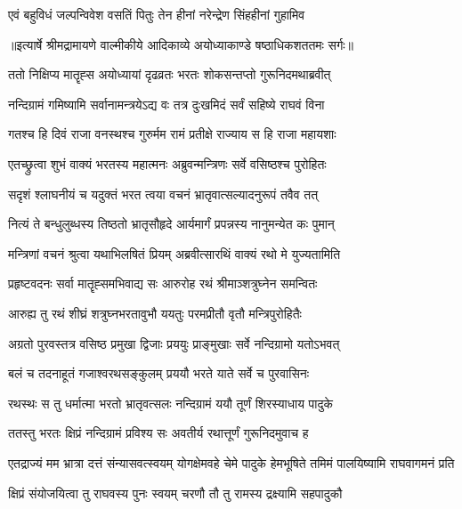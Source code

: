 \twolineshloka
{एवं बहुविधं जल्पन्विवेश वसतिं पितुः}
{तेन हीनां नरेन्द्रेण सिंहहीनां गुहामिव} %


{॥इत्यार्षे श्रीमद्रामायणे वाल्मीकीये आदिकाव्ये अयोध्याकाण्डे षष्ठाधिकशततमः सर्गः॥}


\twolineshloka
{ततो निक्षिप्य मातॄह्स अयोध्यायां दृढव्रतः}
{भरतः शोकसन्तप्तो गुरूनिदमथाब्रवीत्} %

\twolineshloka
{नन्दिग्रामं गमिष्यामि सर्वानामन्त्रयेऽद्य वः}
{तत्र दुःखमिदं सर्वं सहिष्ये राघवं विना} %

\twolineshloka
{गतश्च हि दिवं राजा वनस्थश्च गुरुर्मम}
{रामं प्रतीक्षे राज्याय स हि राजा महायशाः} %

\twolineshloka
{एतच्छ्रुत्वा शुभं वाक्यं भरतस्य महात्मनः}
{अब्रुवन्मन्त्रिणः सर्वे वसिष्ठश्च पुरोहितः} %

\twolineshloka
{सदृशं श्लाघनीयं च यदुक्तं भरत त्वया}
{वचनं भ्रातृवात्सल्यादनुरूपं तवैव तत्} %

\twolineshloka
{नित्यं ते बन्धुलुब्धस्य तिष्ठतो भ्रातृसौहृदे}
{आर्यमार्गं प्रपन्नस्य नानुमन्येत कः पुमान्} %

\twolineshloka
{मन्त्रिणां वचनं श्रुत्वा यथाभिलषितं प्रियम्}
{अब्रवीत्सारथिं वाक्यं रथो मे युज्यतामिति} %

\twolineshloka
{प्रहृष्टवदनः सर्वा मातॄह्समभिवाद्य सः}
{आरुरोह रथं श्रीमाञ्शत्रुघ्नेन समन्वितः} %

\twolineshloka
{आरुह्य तु रथं शीघ्रं शत्रुघ्नभरतावुभौ}
{ययतुः परमप्रीतौ वृतौ मन्त्रिपुरोहितैः} %

\twolineshloka
{अग्रतो पुरवस्तत्र वसिष्ठ प्रमुखा द्विजाः}
{प्रययुः प्राङ्मुखाः सर्वे नन्दिग्रामो यतोऽभवत्} %

\twolineshloka
{बलं च तदनाहूतं गजाश्वरथसङ्कुलम्}
{प्रययौ भरते याते सर्वे च पुरवासिनः} %

\twolineshloka
{रथस्थः स तु धर्मात्मा भरतो भ्रातृवत्सलः}
{नन्दिग्रामं ययौ तूर्णं शिरस्याधाय पादुके} %

\twolineshloka
{ततस्तु भरतः क्षिप्रं नन्दिग्रामं प्रविश्य सः}
{अवतीर्य रथात्तूर्णं गुरूनिदमुवाच ह} %

\threelineshloka
{एतद्राज्यं मम भ्रात्रा दत्तं संन्यासवत्स्वयम्}
{योगक्षेमवहे चेमे पादुके हेमभूषिते}
{तमिमं पालयिष्यामि राघवागमनं प्रति} %

\twolineshloka
{क्षिप्रं संयोजयित्वा तु राघवस्य पुनः स्वयम्}
{चरणौ तौ तु रामस्य द्रक्ष्यामि सहपादुकौ} %

